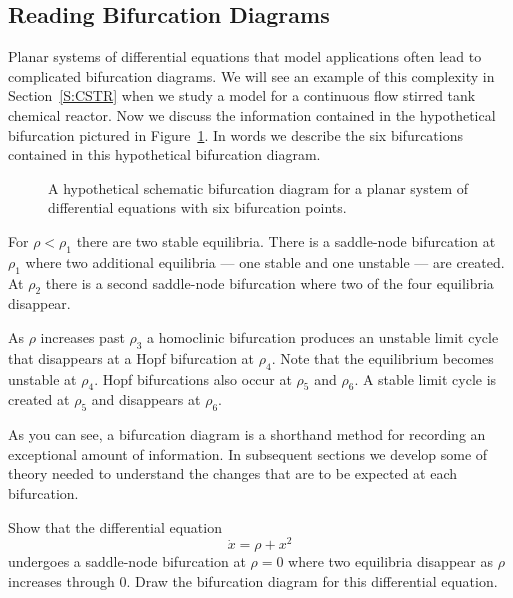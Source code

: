 \documentclass{ximera}
\begin{document}
\subsection*{Reading Bifurcation Diagrams}

Planar systems of differential equations that model applications often
lead to complicated bifurcation diagrams.  We will see an example
of this complexity in Section~\ref{S:CSTR} when we study a model for a 
continuous flow stirred tank chemical reactor.  
Now we discuss the information contained in the hypothetical bifurcation 
pictured in Figure~\ref{F:hypo}. In words we describe the six bifurcations
contained in this hypothetical bifurcation diagram. 

\begin{figure}[htb]
           \centerline{%
           }
  	   \caption{A hypothetical schematic bifurcation diagram for a planar 
	  system of differential equations with six bifurcation points.} 
           \label{F:hypo}
\end{figure}

For $\rho<\rho_1$
there are two stable equilibria.  There is a saddle-node bifurcation 
at $\rho_1$ where two additional equilibria --- one stable and one 
unstable --- are created.  At $\rho_2$ there is a second saddle-node 
bifurcation where two of the four equilibria disappear.  

As $\rho$ increases past $\rho_3$ a homoclinic 
bifurcation produces an
unstable limit cycle that disappears at a 
Hopf bifurcation at $\rho_4$.  
Note that the equilibrium becomes unstable at $\rho_4$.
Hopf bifurcations also occur at $\rho_5$ and $\rho_6$.   A stable
limit cycle is created at $\rho_5$ and disappears at $\rho_6$.

As you can see, a  bifurcation diagram is a shorthand method for recording
an exceptional amount of information.  In subsequent sections we develop 
some of theory needed to understand the changes that are to be expected 
at each bifurcation.  

\EXER

\TEXER

\begin{exercise} \label{c9.7.1}
Show that the differential equation 
\[
\dot{x} = \rho + x^2
\]
undergoes a saddle-node bifurcation at $\rho=0$ where two equilibria 
disappear as $\rho$ increases through $0$.  Draw the bifurcation diagram 
for this differential equation.
\end{exercise}
\end{document}

